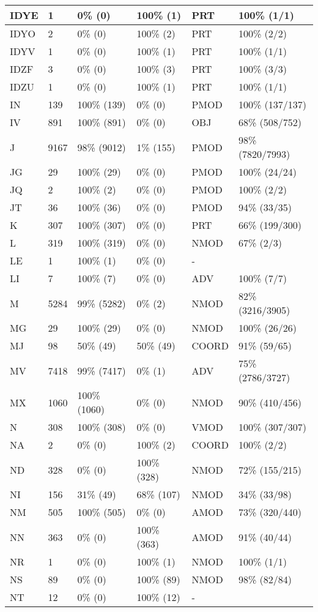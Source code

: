 \begin{figure*}
\begin{tabular}{|l|l|l|l||l|l|}
\hline
 IDYE & 1 & 0\% (0) & 100\% (1) & PRT & 100\% (1/1) \\ 
\hline
 IDYO & 2 & 0\% (0) & 100\% (2) & PRT & 100\% (2/2) \\ 
\hline
 IDYV & 1 & 0\% (0) & 100\% (1) & PRT & 100\% (1/1) \\ 
\hline
 IDZF & 3 & 0\% (0) & 100\% (3) & PRT & 100\% (3/3) \\ 
\hline
 IDZU & 1 & 0\% (0) & 100\% (1) & PRT & 100\% (1/1) \\ 
\hline
 IN & 139 & 100\% (139) & 0\% (0) & PMOD & 100\% (137/137) \\ 
\hline
 IV & 891 & 100\% (891) & 0\% (0) & OBJ & 68\% (508/752) \\ 
\hline
 J & 9167 & 98\% (9012) & 1\% (155) & PMOD & 98\% (7820/7993) \\ 
\hline
 JG & 29 & 100\% (29) & 0\% (0) & PMOD & 100\% (24/24) \\ 
\hline
 JQ & 2 & 100\% (2) & 0\% (0) & PMOD & 100\% (2/2) \\ 
\hline
 JT & 36 & 100\% (36) & 0\% (0) & PMOD & 94\% (33/35) \\ 
\hline
 K & 307 & 100\% (307) & 0\% (0) & PRT & 66\% (199/300) \\ 
\hline
 L & 319 & 100\% (319) & 0\% (0) & NMOD & 67\% (2/3) \\ 
\hline
 LE & 1 & 100\% (1) & 0\% (0) & - &  \\ 
\hline
 LI & 7 & 100\% (7) & 0\% (0) & ADV & 100\% (7/7) \\ 
\hline
 M & 5284 & 99\% (5282) & 0\% (2) & NMOD & 82\% (3216/3905) \\ 
\hline
 MG & 29 & 100\% (29) & 0\% (0) & NMOD & 100\% (26/26) \\ 
\hline
 MJ & 98 & 50\% (49) & 50\% (49) & COORD & 91\% (59/65) \\ 
\hline
 MV & 7418 & 99\% (7417) & 0\% (1) & ADV & 75\% (2786/3727) \\ 
\hline
 MX & 1060 & 100\% (1060) & 0\% (0) & NMOD & 90\% (410/456) \\ 
\hline
 N & 308 & 100\% (308) & 0\% (0) & VMOD & 100\% (307/307) \\ 
\hline
 NA & 2 & 0\% (0) & 100\% (2) & COORD & 100\% (2/2) \\ 
\hline
 ND & 328 & 0\% (0) & 100\% (328) & NMOD & 72\% (155/215) \\ 
\hline
 NI & 156 & 31\% (49) & 68\% (107) & NMOD & 34\% (33/98) \\ 
\hline
 NM & 505 & 100\% (505) & 0\% (0) & AMOD & 73\% (320/440) \\ 
\hline
 NN & 363 & 0\% (0) & 100\% (363) & AMOD & 91\% (40/44) \\ 
\hline
 NR & 1 & 0\% (0) & 100\% (1) & NMOD & 100\% (1/1) \\ 
\hline
 NS & 89 & 0\% (0) & 100\% (89) & NMOD & 98\% (82/84) \\ 
\hline
 NT & 12 & 0\% (0) & 100\% (12) & - &  \\ 
\hline
\end{tabular}
\end{figure*}
